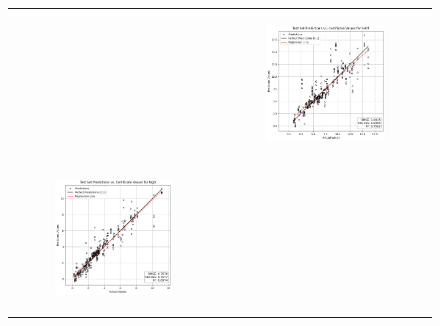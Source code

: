 \begin{figure}
{\begin{tabular}{cc}
\begin{subfigure}{0.5\textwidth}
            \end{subfigure} & \hspace{3cm}
            \begin{subfigure}{0.5\textwidth}
                \includegraphics[width=\textwidth]{images/one_to_one/enetalpha01/FeOT.png}
            \end{subfigure} \\
            \begin{subfigure}{0.5\textwidth}
                \includegraphics[width=\textwidth]{images/one_to_one/enetalpha01/MgO.png}

\end{subfigure}
\end{tabular}}
\end{figure}
